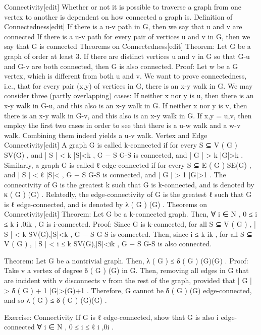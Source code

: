 Connectivity[edit]
Whether or not it is possible to traverse a graph from one vertex to another is dependent on how connected a graph is. 
Definition of Connectedness[edit]
If there is a u-v path in G, then we say that u and v are connected
If there is a u-v path for every pair of vertices u and v in G, then we say that G is connected
Theorems on Connectedness[edit]
Theorem: Let G be a graph of order at least 3. If there are distinct vertices u and v in G so that G-u and G-v are both connected, then G is also connected. 
Proof: Let w be a G vertex, which is different from both u and v. We want to prove connectedness, i.e., that for every pair (x,y) of vertices in G, there is an x-y walk in G. We may consider three (partly overlapping) cases: 
If neither x nor y is u, then there is an x-y walk in G-u, and this also is an x-y walk in G.
If neither x nor y is v, then there is an x-y walk in G-v, and this also is an x-y walk in G.
If {x,y} = {u,v}, then employ the first two cases in order to see that there is a u-w walk and a w-v walk. Combining them indeed yields a u-v walk.
Vertex and Edge Connectivity[edit]
A graph G is called k-connected if for every 
S ⊆ V ( G ) {\displaystyle S\subseteq V(G)} 
, and 
| S | < k {\displaystyle |S|<k} 
, 
G − S {\displaystyle G-S} 
 is connected, and 
| G | > k {\displaystyle |G|>k} 
. 
Similarly, a graph G is called 
ℓ {\displaystyle \ell } 
 edge-connected if for every 
S ⊆ E ( G ) {\displaystyle S\subseteq E(G)} 
, and 
| S | < ℓ {\displaystyle |S|<\ell } 
, 
G − S {\displaystyle G-S} 
 is connected, and 
| G | > 1 {\displaystyle |G|>1} 
. 
The connectivity of G is the greatest k such that G is k-connected, and is denoted by 
κ ( G ) {\displaystyle \kappa (G)} 
. 
Relatedly, the edge-connectivity of G is the greatest 
ℓ {\displaystyle \ell } 
 such that G is 
ℓ {\displaystyle \ell } 
 edge-connected, and is denoted by 
λ ( G ) {\displaystyle \lambda (G)} 
. 
Theorems on Connectivity[edit]
Theorem: Let G be a k-connected graph. Then, 
∀ i ∈ N , 0 ≤ i ≤ k {\displaystyle \forall i\in {} ,0\leq i\leq k} 
, G is i-connected. 
Proof: Since G is k-connected, for all 
S ⊆ V ( G ) , | S | < k {\displaystyle S\subseteq V(G),|S|<k} 
, 
G − S {\displaystyle G-S} 
 is connected. Then, since 
i ≤ k {\displaystyle i\leq k} 
, for all 
S ⊆ V ( G ) , | S | < i ≤ k {\displaystyle S\subseteq V(G),|S|<i\leq k} 
, 
G − S {\displaystyle G-S} 
 is also connected. 

Theorem: Let G be a nontrivial graph. Then, 
λ ( G ) ≤ δ ( G ) {\displaystyle \lambda (G)\leq \delta (G)} 
. 
Proof: Take v a vertex of degree 
δ ( G ) {\displaystyle \delta (G)} 
 in G. Then, removing all edges in G that are incident with v disconnects v from the rest of the graph, provided that 
| G | > δ ( G ) + 1 {\displaystyle |G|>\delta (G)+1} 
. Therefore, G cannot be 
δ ( G ) {\displaystyle \delta (G)} 
 edge-connected, and so 
λ ( G ) ≤ δ ( G ) {\displaystyle \lambda (G)\leq \delta (G)} 
. 

Exercise: Connectivity
If G is 
ℓ {\displaystyle \ell } 
 edge-connected, show that G is also i edge-connected 
∀ i ∈ N , 0 ≤ i ≤ ℓ {\displaystyle \forall i\in {} ,0\leq i\leq \ell } 
.
